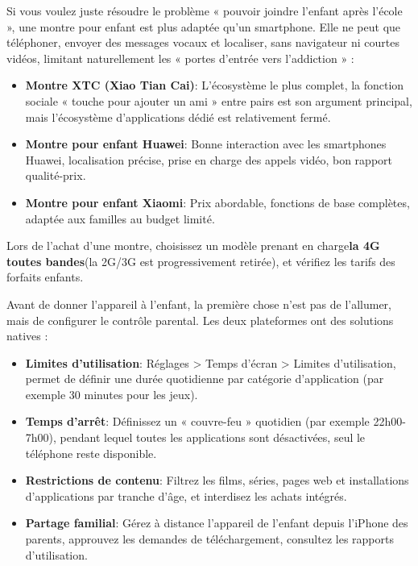
Si vous voulez juste résoudre le problème « pouvoir joindre l'enfant après l'école », une montre pour enfant est plus adaptée qu'un smartphone. Elle ne peut que téléphoner, envoyer des messages vocaux et localiser, sans navigateur ni courtes vidéos, limitant naturellement les « portes d'entrée vers l'addiction » :

\begin{itemize}
  \item \textbf{Montre XTC (Xiao Tian Cai)}: L'écosystème le plus complet, la fonction sociale « touche pour ajouter un ami » entre pairs est son argument principal, mais l'écosystème d'applications dédié est relativement fermé.
  \item \textbf{Montre pour enfant Huawei}: Bonne interaction avec les smartphones Huawei, localisation précise, prise en charge des appels vidéo, bon rapport qualité-prix.
  \item \textbf{Montre pour enfant Xiaomi}: Prix abordable, fonctions de base complètes, adaptée aux familles au budget limité.
\end{itemize}

Lors de l'achat d'une montre, choisissez un modèle prenant en charge\textbf{la 4G toutes bandes}(la 2G/3G est progressivement retirée), et vérifiez les tarifs des forfaits enfants.


Avant de donner l'appareil à l'enfant, la première chose n'est pas de l'allumer, mais de configurer le contrôle parental. Les deux plateformes ont des solutions natives :


\begin{itemize}
  \item \textbf{Limites d'utilisation}: Réglages > Temps d'écran > Limites d'utilisation, permet de définir une durée quotidienne par catégorie d'application (par exemple 30 minutes pour les jeux).
  \item \textbf{Temps d'arrêt}: Définissez un « couvre-feu » quotidien (par exemple 22h00-7h00), pendant lequel toutes les applications sont désactivées, seul le téléphone reste disponible.
  \item \textbf{Restrictions de contenu}: Filtrez les films, séries, pages web et installations d'applications par tranche d'âge, et interdisez les achats intégrés.
  \item \textbf{Partage familial}: Gérez à distance l'appareil de l'enfant depuis l'iPhone des parents, approuvez les demandes de téléchargement, consultez les rapports d'utilisation.
\end{itemize}

